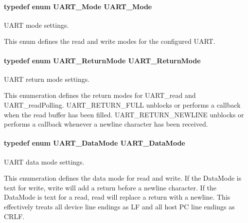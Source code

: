 \paragraph[{U\+A\+R\+T\+\_\+\+Mode}]{\setlength{\rightskip}{0pt plus 5cm}typedef enum {\bf U\+A\+R\+T\+\_\+\+Mode}  {\bf U\+A\+R\+T\+\_\+\+Mode}}\label{_u_a_r_t_8h_a247ea9ec7b19a8e46dab1ac86b3eb0a7}


U\+A\+R\+T mode settings. 

This enum defines the read and write modes for the configured U\+A\+R\+T. 
\paragraph[{U\+A\+R\+T\+\_\+\+Return\+Mode}]{\setlength{\rightskip}{0pt plus 5cm}typedef enum {\bf U\+A\+R\+T\+\_\+\+Return\+Mode}  {\bf U\+A\+R\+T\+\_\+\+Return\+Mode}}\label{_u_a_r_t_8h_a5fe0b5a28881f05c198e4226536cf62b}


U\+A\+R\+T return mode settings. 

This enumeration defines the return modes for U\+A\+R\+T\+\_\+read and U\+A\+R\+T\+\_\+read\+Polling. U\+A\+R\+T\+\_\+\+R\+E\+T\+U\+R\+N\+\_\+\+F\+U\+L\+L unblocks or performs a callback when the read buffer has been filled. U\+A\+R\+T\+\_\+\+R\+E\+T\+U\+R\+N\+\_\+\+N\+E\+W\+L\+I\+N\+E unblocks or performs a callback whenever a newline character has been received. 
\paragraph[{U\+A\+R\+T\+\_\+\+Data\+Mode}]{\setlength{\rightskip}{0pt plus 5cm}typedef enum {\bf U\+A\+R\+T\+\_\+\+Data\+Mode}  {\bf U\+A\+R\+T\+\_\+\+Data\+Mode}}\label{_u_a_r_t_8h_a5d5d37ac84acc0ea543ef3737460d41a}


U\+A\+R\+T data mode settings. 

This enumeration defines the data mode for read and write. If the Data\+Mode is text for write, write will add a return before a newline character. If the Data\+Mode is text for a read, read will replace a return with a newline. This effectively treats all device line endings as L\+F and all host P\+C line endings as C\+R\+L\+F. 
